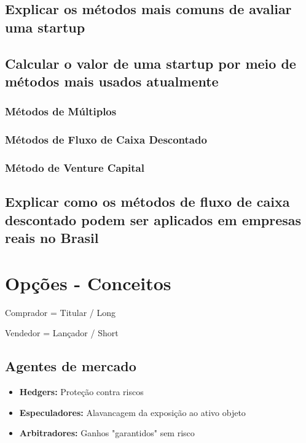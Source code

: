 \documentclass{sciposter}
\begin{document}
\begin{multicols}{3}
\subsection{\textbf{Explicar os métodos mais comuns de avaliar uma startup}}
\subsection{\textbf{Calcular o valor de uma startup por meio de métodos mais usados atualmente}}
\subsubsection{\textbf{Métodos de Múltiplos}}
\subsubsection{\textbf{Métodos de Fluxo de Caixa Descontado}}
\subsubsection{\textbf{Método de Venture Capital}}
\subsection{\textbf{Explicar como os métodos de fluxo de caixa descontado podem ser aplicados em empresas reais no Brasil}}

\section{Opções - Conceitos}
    \begin{center}
    Comprador = Titular / Long
    
    Vendedor = Lançador / Short
    \end{center}
\vspace{0.75 cm}
\subsection*{\textbf{Agentes de mercado}}
\begin{itemize}
    \item \textbf{Hedgers:} Proteção contra riscos
\end{itemize}
\begin{itemize}
    \item \textbf{Especuladores:} Alavancagem da exposição ao ativo objeto
    \item \textbf{Arbitradores:} Ganhos "garantidos" sem risco
\end{itemize}


\end{multicols}
\end{document}
